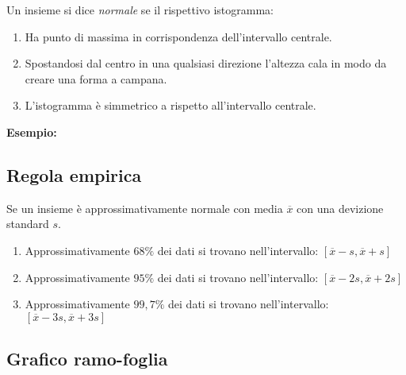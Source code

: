 \documentclass{article}
\begin{document}
\begin{tcolorbox}
Un insieme si dice \textit{normale} se il rispettivo istogramma:
\begin{enumerate}
  \item Ha punto di massima in corrispondenza dell'intervallo centrale.
  \item Spostandosi dal centro in una qualsiasi direzione l'altezza cala in modo da creare una forma a campana.
  \item L'istogramma è simmetrico a rispetto all'intervallo centrale.
\end{enumerate}
 
  \textbf{Esempio:} 


\end{tcolorbox}

\subsection*{Regola empirica}

Se un insieme è approssimativamente normale con media $\overline{x}$ con una devizione standard $s$.

\begin{enumerate}
  \item Approssimativamente $68\%$ dei dati si trovano nell'intervallo: $[\overline{x}-s,\overline{x}+s]$
  \item Approssimativamente $95\%$ dei dati si trovano nell'intervallo: $[\overline{x}-2s,\overline{x}+2s]$
  \item Approssimativamente $99,7\%$ dei dati si trovano nell'intervallo: $[\overline{x}-3s,\overline{x}+3s]$

\end{enumerate}


\subsection*{Grafico ramo-foglia}
\end{document}
